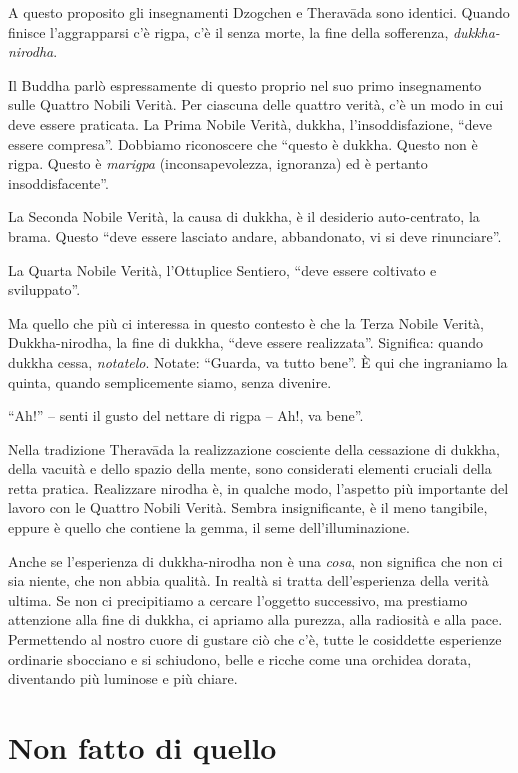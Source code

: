 A questo proposito gli insegnamenti Dzogchen e Theravāda sono identici. Quando finisce l'aggrapparsi c'è rigpa, c'è il senza morte, la fine della sofferenza, \textit{dukkha-nirodha}.

Il Buddha parlò espressamente di questo proprio nel suo primo insegnamento sulle Quattro Nobili Verità. Per ciascuna delle quattro verità, c'è un modo in cui deve essere praticata. La Prima Nobile Verità, dukkha, l'insoddisfazione, ``deve essere compresa''. Dobbiamo riconoscere che ``questo è dukkha. Questo non è rigpa. Questo è \textit{marigpa} (inconsapevolezza, ignoranza) ed è pertanto insoddisfacente''.

La Seconda Nobile Verità, la causa di dukkha, è il desiderio auto-centrato, la brama. Questo ``deve essere lasciato andare, abbandonato, vi si deve rinunciare''. 

La Quarta Nobile Verità, l'Ottuplice Sentiero, ``deve essere coltivato e sviluppato''.

Ma quello che più ci interessa in questo contesto è che la Terza Nobile Verità, Dukkha-nirodha, la fine di dukkha, ``deve essere realizzata''. Significa: quando dukkha cessa, \textit{notatelo}. Notate: ``Guarda, va tutto bene''. È qui che ingraniamo la quinta, quando semplicemente siamo, senza divenire.

``Ah!'' -- senti il gusto del nettare di rigpa -- Ah!, va bene''.

Nella tradizione Theravāda la realizzazione cosciente della cessazione di dukkha, della vacuità e dello spazio della mente, sono considerati elementi cruciali della retta pratica. Realizzare nirodha è, in qualche modo, l'aspetto più importante del lavoro con le Quattro Nobili Verità. Sembra insignificante, è il meno tangibile, eppure è quello che contiene la gemma, il seme dell'illuminazione.

Anche se l'esperienza di dukkha-nirodha non è una \textit{cosa}, non significa che non ci sia niente, che non abbia qualità. In realtà si tratta dell'esperienza della verità ultima. Se non ci precipitiamo a cercare l'oggetto successivo, ma prestiamo attenzione alla fine di dukkha, ci apriamo alla purezza, alla radiosità e alla pace. Permettendo al nostro cuore di gustare ciò che c'è, tutte le cosiddette esperienze ordinarie sbocciano e si schiudono, belle e ricche come una orchidea dorata, diventando più luminose e più chiare.

\section*{Non fatto di quello}

